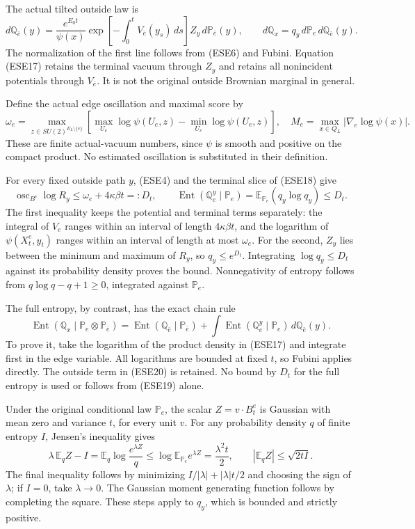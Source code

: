 \documentclass[11pt]{article}
\begin{document}
The actual tilted outside law is
\[
 d\mathbb Q_{\bar e}(y)
 =\frac{e^{E_0t}}{\psi(x)}
   \exp\left[-\int_0^tV_{\bar e}(y_s)\,ds\right]
        Z_y\,d\mathbb P_{\bar e}(y),
 \qquad
 d\mathbb Q_x=q_y\,d\mathbb P_e\,d\mathbb Q_{\bar e}(y).
 \tag{ESE17}
\]
The normalization of the first line follows from (ESE6) and Fubini. Equation (ESE17) retains the terminal vacuum through \(Z_y\) and retains all nonincident potentials through \(V_{\bar e}\). It is not the original outside Brownian marginal in general.

Define the actual edge oscillation and maximal score by
\[
 \omega_e=\max_{z\in SU(2)^{E_L\setminus\{e\}}}
       \left[\max_{U_e}\log\psi(U_e,z)
                         -\min_{U_e}\log\psi(U_e,z)\right],
 \quad
 M_e=\max_{x\in Q_L}|\nabla_e\log\psi(x)|.
 \tag{ESE18}
\]
These are finite actual-vacuum numbers, since \(\psi\) is smooth and positive on the compact product. No estimated oscillation is substituted in their definition.

For every fixed outside path \(y\), (ESE4) and the terminal slice of (ESE18) give
\[
 \operatorname{osc}_{B^e}\log R_y
     \le\omega_e+4\kappa\beta t=:D_t,\qquad
 \operatorname{Ent}(\mathbb Q_e^y\mid\mathbb P_e)
       =\mathbb E_{\mathbb P_e}(q_y\log q_y)\le D_t.
 \tag{ESE19}
\]
The first inequality keeps the potential and terminal terms separately: the integral of \(V_e\) ranges within an interval of length \(4\kappa\beta t\), and the logarithm of \(\psi(X_t^e,y_t)\) ranges within an interval of length at most \(\omega_e\). For the second, \(Z_y\) lies between the minimum and maximum of \(R_y\), so \(q_y\le e^{D_t}\). Integrating \(\log q_y\le D_t\) against its probability density proves the bound. Nonnegativity of entropy follows from \(q\log q-q+1\ge0\), integrated against \(\mathbb P_e\).

The full entropy, by contrast, has the exact chain rule
\[
 \operatorname{Ent}(\mathbb Q_x\mid\mathbb P_e\otimes\mathbb P_{\bar e})
 =\operatorname{Ent}(\mathbb Q_{\bar e}\mid\mathbb P_{\bar e})
    +\int\operatorname{Ent}(\mathbb Q_e^y\mid\mathbb P_e)
                                  \,d\mathbb Q_{\bar e}(y).
 \tag{ESE20}
\]
To prove it, take the logarithm of the product density in (ESE17) and integrate first in the edge variable. All logarithms are bounded at fixed \(t\), so Fubini applies directly. The outside term in (ESE20) is retained. No bound by \(D_t\) for the full entropy is used or follows from (ESE19) alone.

Under the original conditional law \(\mathbb P_e\), the scalar \(Z=v\cdot B_t^e\) is Gaussian with mean zero and variance \(t\), for every unit \(v\). For any probability density \(q\) of finite entropy \(I\), Jensen's inequality gives
\[
 \lambda\,\mathbb E_qZ-I
  =\mathbb E_q\log\frac{e^{\lambda Z}}q
  \le\log\mathbb E_{\mathbb P_e}e^{\lambda Z}
  =\frac{\lambda^2t}{2},\qquad
 |\mathbb E_qZ|\le\sqrt{2tI}.
 \tag{ESE21}
\]
The final inequality follows by minimizing \(I/|\lambda|+|\lambda|t/2\) and choosing the sign of \(\lambda\); if \(I=0\), take \(\lambda\to0\). The Gaussian moment generating function follows by completing the square. These steps apply to \(q_y\), which is bounded and strictly positive.
\end{document}
